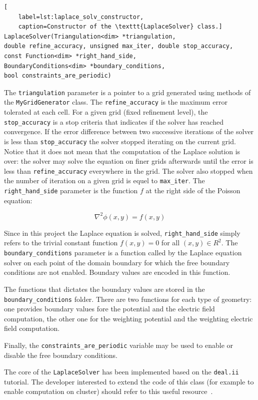 \documentclass[11pt]{article}
\begin{document}
\begin{lstlisting}[
	label=lst:laplace_solv_constructor,
	caption=Constructor of the \texttt{LaplaceSolver} class.]
LaplaceSolver(Triangulation<dim> *triangulation,
double refine_accuracy, unsigned max_iter, double stop_accuracy,
const Function<dim> *right_hand_side,
BoundaryConditions<dim> *boundary_conditions,
bool constraints_are_periodic)
\end{lstlisting}

The \texttt{triangulation} parameter is a pointer to a grid generated using methods of
the \texttt{MyGridGenerator} class. The \texttt{refine\_accuracy} is the maximum
error tolerated at each cell. For a given grid (fixed refinement level),
the \texttt{stop\_accuracy}  is a stop criteria that indicates if the solver has
reached convergence. If the error difference between two successive iterations
of the solver is less than \texttt{stop\_accuracy} the solver stopped iterating
on the current grid. Notice that it does not mean that the computation of the
Laplace solution is over: the solver may solve the equation on finer grids
afterwards until the error is less than \texttt{refine\_accuracy} everywhere
in the grid. The solver also stopped when the number of iteration on a given
grid is equel to \texttt{max\_iter}. The \texttt{right\_hand\_side} parameter
is the function $f$ at the right side of the Poisson equation:

\[\nabla^2 \phi(x,y) = f(x,y)\]

Since in this project the Laplace equation is solved, \texttt{right\_hand\_side}
simply refers to the trivial constant function $f(x,y) = 0$ for all $(x,y) \in R^2$.
The \texttt{boundary\_conditions} parameter is a function called by the Laplace
equation solver on each point of the domain boundary for which the free
boundary conditions are not enabled. Boundary values are encoded in this function.

The functions that dictates the boundary values are stored in the
\texttt{boundary\_conditions} folder. There are two functions for each
type of geometry: one provides boundary values fore the potential and the electric
field computation, the other one for the weighting potential and the weighting
electric field computation.

Finally, the \texttt{constraints\_are\_periodic} variable may be used to
enable or disable the free boundary conditions.

The core of the \texttt{LaplaceSolver} has been implemented based on the
\texttt{deal.ii} tutorial. The developer interested to extend the code of this
class (for example to enable computation on cluster) should refer to this
useful resource~\cite{deal.iituto}.
\end{document}

